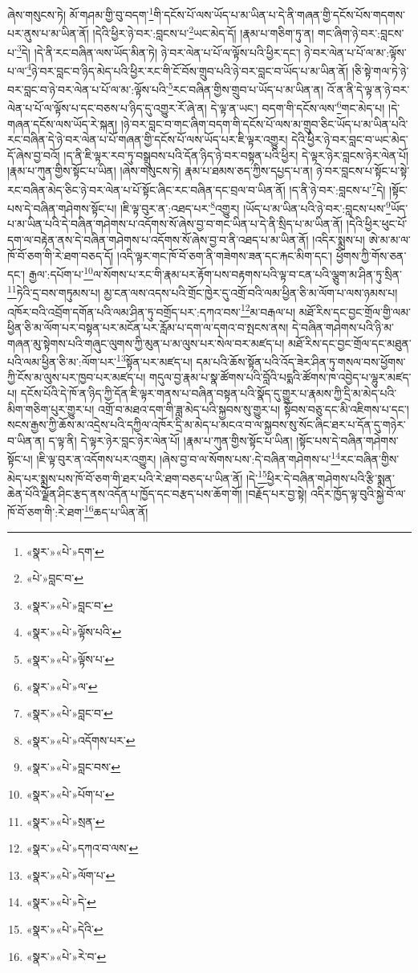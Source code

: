 ཞེས་གསུངས་ཏེ། མོ་གཤམ་གྱི་བུ་བདག་\footnote{«སྣར་»«པེ་»དག་}གི་དངོས་པོ་ལས་ཡོད་པ་མ་ཡིན་པ་དེ་ནི་གཞན་གྱི་དངོས་པོས་གདགས་པར་ནུས་པ་མ་ཡིན་ནོ། །དེའི་ཕྱིར་ཉེ་བར་:བླངས་པ་\footnote{«པེ་»བླང་བ་}ཡང་མེད་དོ། །རྣམ་པ་གཅིག་ཏུ་ན། གང་ཞིག་ཉེ་བར་:བླངས་པ་\footnote{«སྣར་»«པེ་»བླང་བ་}དེ། །དེ་ནི་རང་བཞིན་ལས་ཡོད་མིན་ཏེ། ཉེ་བར་ལེན་པ་པོ་ལ་ལྟོས་པའི་ཕྱིར་དང་། ཉེ་བར་ལེན་པ་པོ་ལ་མ་:ལྟོས་པ་ལ་\footnote{«སྣར་»«པེ་»ལྟོས་པའི་}ཉེ་བར་བླང་བ་ཉིད་མེད་པའི་ཕྱིར་རང་གི་ངོ་བོས་གྲུབ་པའི་ཉེ་བར་བླང་བ་ཡོད་པ་མ་ཡིན་ནོ། །ཅི་སྟེ་གལ་ཏེ་ཉེ་བར་བླང་བ་ཉེ་བར་ལེན་པ་པོ་ལ་མ་:ལྟོས་པའི་\footnote{«སྣར་»«པེ་»ལྟོས་པ་}རང་བཞིན་གྱིས་གྲུབ་པ་ཡོད་པ་མ་ཡིན་ན། འོ་ན་ནི་དེ་ལྟ་ན་ཉེ་བར་ལེན་པ་པོ་ལ་ལྟོས་པ་དང་བཅས་པ་ཉིད་དུ་འགྱུར་རོ་ཞེ་ན། དེ་ལྟ་ན་ཡང་། བདག་གི་དངོས་ལས་\footnote{«སྣར་»«པེ་»ལ་}གང་མེད་པ། །དེ་གཞན་དངོས་ལས་ཡོད་རེ་སྐན། །ཉེ་བར་བླང་བ་གང་ཞིག་བདག་གི་དངོས་པོ་ལས་མ་གྲུབ་ཅིང་ཡོད་པ་མ་ཡིན་པའི་རང་བཞིན་དེ་ཉེ་བར་ལེན་པ་པོ་གཞན་གྱི་དངོས་པོ་ལས་ཡོད་པར་ཇི་ལྟར་འགྱུར། དེའི་ཕྱིར་ཉེ་བར་བླང་བ་ཡང་མེད་དོ་ཞེས་བྱ་བའོ། །ད་ནི་ཇི་ལྟར་རབ་ཏུ་བསྒྲུབས་པའི་དོན་ཉིད་ཉེ་བར་བསྟན་པའི་ཕྱིར། དེ་ལྟར་ཉེར་བླངས་ཉེར་ལེན་པོ། །རྣམ་པ་ཀུན་གྱིས་སྟོང་པ་ཡིན། །ཞེས་གསུངས་ཏེ། རྣམ་པ་ཐམས་ཅད་ཀྱིས་དཔྱད་པ་ན། ཉེ་བར་བླངས་པ་སྟོང་པ་སྟེ་རང་བཞིན་མེད་ཅིང་ཉེ་བར་ལེན་པ་པོ་སྟོང་ཞིང་རང་བཞིན་དང་བྲལ་བ་ཡིན་ནོ། །ད་ནི་ཉེ་བར་:བླངས་པ་\footnote{«སྣར་»«པེ་»བླང་བ་}དེ། །སྟོང་པས་དེ་བཞིན་གཤེགས་སྟོང་པ། །ཇི་ལྟ་བུར་ན་:འཐད་པར་\footnote{«སྣར་»«པེ་»འདོགས་པར་}འགྱུར། །ཡོད་པ་མ་ཡིན་པའི་ཉེ་བར་:བླངས་པས་\footnote{«སྣར་»«པེ་»བླང་བས་}ཡོད་པ་མ་ཡིན་པའི་དེ་བཞིན་གཤེགས་པ་འདོགས་སོ་ཞེས་བྱ་བ་གང་ཡིན་པ་དེ་ནི་སྲིད་པ་མ་ཡིན་ནོ། །དེའི་ཕྱིར་ཕུང་པོ་དག་ལ་བརྟེན་ནས་དེ་བཞིན་གཤེགས་པ་འདོགས་སོ་ཞེས་བྱ་བ་ནི་འཐད་པ་མ་ཡིན་ནོ། །འདིར་སྨྲས་པ། ཨེ་མ་མ་ལ་ཁོ་བོ་ཅག་གི་རེ་ཐག་བཅད་དོ། །འདི་ལྟར་གང་ཁོ་བོ་ཅག་ནི་གཟེགས་ཟན་དང་རྐང་མིག་དང་། ཕྱོགས་ཀྱི་གོས་ཅན་དང་། རྒྱལ་:དཔོག་པ་\footnote{«སྣར་»«པེ་»པོག་པ་}ལ་སོགས་པ་རང་གི་རྣམ་པར་རྟོག་པས་བརྟགས་པའི་ལྟ་བ་ངན་པའི་ལྕུག་མ་ཤིན་ཏུ་སྲིན་\footnote{«སྣར་»«པེ་»སྲན་}ཏེའི་དྲ་བས་གཏུམས་པ། མྱ་ངན་ལས་འདས་པའི་གྲོང་ཁྱེར་དུ་འགྲོ་བའི་ལམ་ཕྱིན་ཅི་མ་ལོག་པ་ལས་ཉམས་པ། འཁོར་བའི་འབྲོག་དགོན་པའི་ལམ་ཤིན་ཏུ་བགྲོད་པར་:དཀའ་བས་\footnote{«སྣར་»«པེ་»དཀའ་བ་ལས་}མ་བརྒལ་པ། མཐོ་རིས་དང་བྱང་གྲོལ་གྱི་ལམ་ཕྱིན་ཅི་མ་ལོག་པར་བསྟན་པར་མངོན་པར་རློམ་པ་དག་ལ་དགའ་བ་སྤངས་ནས། དེ་བཞིན་གཤེགས་པའི་ཉི་མ་གཞན་མུ་སྟེགས་པའི་གཞུང་ལུགས་ཀྱི་མུན་པ་མ་ལུས་པར་སེལ་བར་མཛད་པ། མཐོ་རིས་དང་བྱང་གྲོལ་དང་མཐུན་པའི་ལམ་ཕྱིན་ཅི་མ་:ལོག་པར་\footnote{«སྣར་»«པེ་»ལོག་པ་}སྟོན་པར་མཛད་པ། དམ་པའི་ཆོས་སྟོན་པའི་འོད་ཟེར་ཤིན་ཏུ་གསལ་བས་ཕྱོགས་ཀྱི་ངོས་མ་ལུས་པར་ཁྱབ་པར་མཛད་པ། གདུལ་བྱ་རྣམ་པ་སྣ་ཚོགས་པའི་བློའི་པདྨའི་ཚོགས་ཁ་འབྱེད་པ་ལྷུར་མཛད་པ། དངོས་པོའི་དེ་ཁོ་ན་ཉིད་ཀྱི་དོན་ཇི་ལྟར་གནས་པ་བཞིན་བསྟན་པའི་སྣོད་དུ་གྱུར་པ་རྣམས་ཀྱི་དྲི་མ་མེད་པའི་མིག་གཅིག་པུར་གྱུར་པ། འགྲོ་བ་མཐའ་དག་གི་ཟླ་མེད་པའི་སྐྱབས་སུ་གྱུར་པ། སྟོབས་བཅུ་དང་མི་འཇིགས་པ་དང་། སངས་རྒྱས་ཀྱི་ཆོས་མ་འདྲེས་པའི་དཀྱིལ་འཁོར་དྲི་མ་མེད་པ་མངའ་བ་ལ་སྐྱབས་སུ་སོང་ཞིང་ཐར་པ་དོན་དུ་གཉེར་བ་ཡིན་ན། ད་ལྟ་ནི། དེ་ལྟར་ཉེར་བླང་ཉེར་ལེན་པོ། །རྣམ་པ་ཀུན་གྱིས་སྟོང་པ་ཡིན། །སྟོང་པས་དེ་བཞིན་གཤེགས་སྟོང་པ། །ཇི་ལྟ་བུར་ན་འདོགས་པར་འགྱུར། །ཞེས་བྱ་བ་ལ་སོགས་པས་:དེ་བཞིན་གཤེགས་པ་\footnote{«སྣར་»«པེ་»དེ་}རང་བཞིན་གྱིས་མེད་པར་སྨྲས་པས་ཁོ་བོ་ཅག་གི་ཐར་པའི་རེ་ཐག་བཅད་པ་ཡིན་ནོ། །དེ་\footnote{«སྣར་»«པེ་»དེའི་}ཕྱིར་དེ་བཞིན་གཤེགས་པའི་རྩི་སྨན་ཆེན་པོའི་ལྗོན་ཤིང་རྩད་ནས་འདོན་པ་ཁྱོད་དང་བརྩད་པས་ཆོག་གོ། །བརྗོད་པར་བྱ་སྟེ། འདིར་ཁྱོད་ལྟ་བུའི་སྐྱེ་བོ་ལ་ཁོ་བོ་ཅག་གི་:རེ་ཐག་\footnote{«སྣར་»«པེ་»རེ་བ་}ཆད་པ་ཡིན་ནོ། 